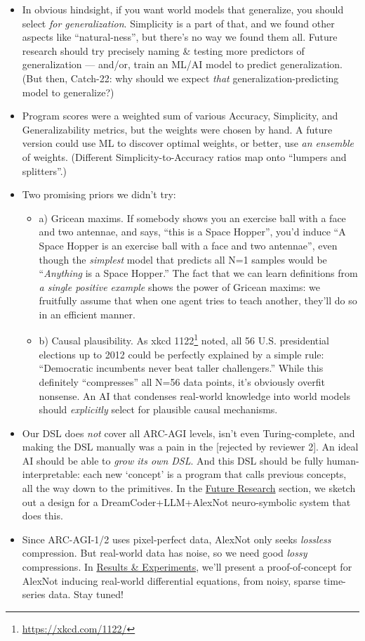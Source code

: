 \documentclass[11pt]{article}
\begin{document}
\begin{itemize}
    \item In obvious hindsight, if you want world models that generalize, you should select \textit{for generalization}. Simplicity is a part of that, and we found other aspects like ``natural-ness'', but there's no way we found them all. Future research should try precisely naming \& testing more predictors of generalization — and/or, train an ML/AI model to predict generalization. (But then, Catch-22: why should we expect \textit{that} generalization-predicting model to generalize?)
    \item Program scores were a weighted sum of various Accuracy, Simplicity, and Generalizability metrics, but the weights were chosen by hand. A future version could use ML to discover optimal weights, or better, use \textit{an ensemble} of weights. (Different Simplicity-to-Accuracy ratios map onto ``lumpers and splitters''.)
    \item Two promising priors we didn't try:
    \begin{itemize}
        \item a) Gricean maxims. \citep{grice_logic_conversation} If somebody shows you an exercise ball with a face and two antennae, and says, ``this is a Space Hopper'', you'd induce ``A Space Hopper is an exercise ball with a face and two antennae'', even though the \textit{simplest} model that predicts all N=1 samples would be ``\textit{Anything} is a Space Hopper.'' The fact that we can learn definitions from \textit{a single positive example} shows the power of Gricean maxims: we fruitfully assume that when one agent tries to teach another, they'll do so in an efficient manner.
        \item b) Causal plausibility. As xkcd 1122\footnote{\url{https://xkcd.com/1122/}} noted, all 56 U.S. presidential elections up to 2012 could be perfectly explained by a simple rule: ``Democratic incumbents never beat taller challengers.'' While this definitely ``compresses'' all N=56 data points, it's obviously overfit nonsense. An AI that condenses real-world knowledge into world models should \textit{explicitly} select for plausible causal mechanisms.
    \end{itemize}
    \item Our DSL does \textit{not} cover all ARC-AGI levels, isn't even Turing-complete, and making the DSL manually was a pain in the [rejected by reviewer 2]. An ideal AI should be able to \textit{grow its own DSL}. And this DSL should be fully human-interpretable: each new `concept' is a program that calls previous concepts, all the way down to the primitives. In the \hyperref[sec:limitations]{Future Research} section, we sketch out a design for a DreamCoder+LLM+AlexNot neuro-symbolic system that does this.
    \item Since ARC-AGI-1/2 uses pixel-perfect data, AlexNot only seeks \textit{lossless} compression. But real-world data has noise, so we need good \textit{lossy} compressions. In \hyperref[sec:results]{Results \& Experiments}, we'll present a proof-of-concept for AlexNot inducing real-world differential equations, from noisy, sparse time-series data. Stay tuned!
\end{itemize}
\end{document}
